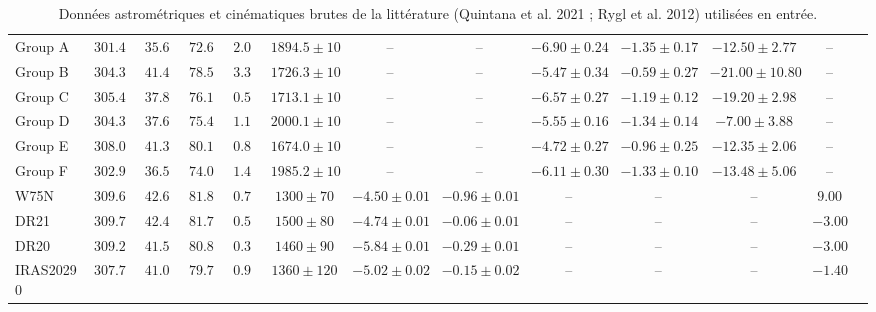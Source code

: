 \documentclass[a4paper, 11pt]{article}
\begin{document}
\begin{table}[H]
{\begin{tabular}{l c c c c c c c c c c c c}
					Group A & $301.45$ & $35.68$ & $72.61$ & $2.06$ & $1894.5 \pm 10$ & -- & -- & $-6.90 \pm 0.24$ & $-1.35 \pm 0.17$ & $-12.50 \pm 2.77$ & -- \\
					Group B & $304.37$ & $41.43$ & $78.58$ & $3.31$ & $1726.3 \pm 10$ & -- & -- & $-5.47 \pm 0.34$ & $-0.59 \pm 0.27$ & $-21.00 \pm 10.80$ & -- \\
					Group C & $305.47$ & $37.87$ & $76.11$ & $0.54$ & $1713.1 \pm 10$ & -- & -- & $-6.57 \pm 0.27$ & $-1.19 \pm 0.12$ & $-19.20 \pm 2.98$ & -- \\
					Group D & $304.34$ & $37.64$ & $75.44$ & $1.19$ & $2000.1 \pm 10$ & -- & -- & $-5.55 \pm 0.16$ & $-1.34 \pm 0.14$ & $-7.00 \pm 3.88$ & -- \\
					Group E & $308.08$ & $41.30$ & $80.19$ & $0.85$ & $1674.0 \pm 10$ & -- & -- & $-4.72 \pm 0.27$ & $-0.96 \pm 0.25$ & $-12.35 \pm 2.06$ & -- \\
					Group F & $302.95$ & $36.58$ & $74.04$ & $1.44$ & $1985.2 \pm 10$ & -- & -- & $-6.11 \pm 0.30$ & $-1.33 \pm 0.10$ & $-13.48 \pm 5.06$ & -- \\
					W75N & $309.65$ & $42.63$ & $81.87$ & $0.78$ & $1300 \pm 70$ & $-4.50 \pm 0.01$ & $-0.96 \pm 0.01$ & -- & -- & -- & $9.00$ \\
					DR21 & $309.76$ & $42.42$ & $81.75$ & $0.59$ & $1500 \pm 80$ & $-4.74 \pm 0.01$ & $-0.06 \pm 0.01$ & -- & -- & -- & $-3.00$ \\
					DR20 & $309.25$ & $41.58$ & $80.86$ & $0.38$ & $1460 \pm 90$ & $-5.84 \pm 0.01$ & $-0.29 \pm 0.01$ & -- & -- & -- & $-3.00$ \\
					IRAS20290 & $307.71$ & $41.04$ & $79.74$ & $0.99$ & $1360 \pm 120$ & $-5.02 \pm 0.02$ & $-0.15 \pm 0.02$ & -- & -- & -- & $-1.40$ \\
					\hline
				\end{tabular}
			}
			\caption{Données astrométriques et cinématiques brutes de la littérature (Quintana et al. 2021 ; Rygl et al. 2012) utilisées en entrée.}
			\label{tab:annexe_donnees_entree}
		\end{table}
\end{document}
